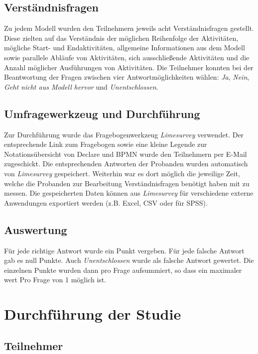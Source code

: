 \subsection{Verständnisfragen}

Zu jedem Modell wurden den Teilnehmern jeweils acht Verständnisfragen gestellt. Diese zielten auf das Verständnis der möglichen Reihenfolge der Aktivitäten, mögliche Start- und Endaktivitäten, allgemeine Informationen aus dem Modell sowie parallele Abläufe von Aktivitäten, sich ausschließende Aktivitäten und die Anzahl möglicher Ausführungen von Aktivitäten.\newline
Die Teilnehmer konnten bei der Beantwortung der Fragen zwischen vier Antwortmöglichkeiten wählen: \textit{Ja}, \textit{Nein}, \textit{Geht nicht aus Modell hervor} und \textit{Unentschlossen}.

\subsection{Umfragewerkzeug und Durchführung}

Zur Durchführung wurde das Fragebogenwerkzeug \textit{Limesurvey} verwendet. Der entsprechende Link zum Fragebogen sowie eine kleine Legende zur Notationsübersicht von Declare und BPMN wurde den Teilnehmern per E-Mail zugeschickt. Die entsprechenden Antworten der Probanden wurden automatisch von \textit{Limesurvey} gespeichert. Weiterhin war es dort möglich die jeweilige Zeit, welche die Probanden zur Bearbeitung Verständnisfragen benötigt haben mit zu messen. Die gespeicherten Daten können aus \textit{Limesurvey} für verschiedene externe Anwendungen exportiert werden (z.B. Excel, CSV oder für SPSS).

\subsection{Auswertung}

Für jede richtige Antwort wurde ein Punkt vergeben. Für jede falsche Antwort gab es null Punkte. Auch \textit{Unentschlossen} wurde als falsche Antwort gewertet. Die einzelnen Punkte wurden dann pro Frage aufsummiert, so dass ein maximaler wert Pro Frage von 1 möglich ist.

\section{Durchführung der Studie}

\subsection{Teilnehmer}

